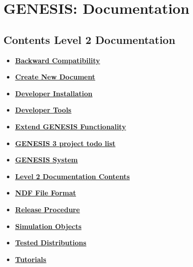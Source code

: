\documentclass[12pt]{article}
\begin{document}
\section*{GENESIS: Documentation}

\subsection*{Contents Level 2 Documentation}

\begin{itemize}

\item \href{../backward-compatibility/backward-compatibility.pdf}{\bf \underline{Backward Compatibility}}

\item \href{../create-document/create-document.pdf}{\bf \underline{Create New Document}}

\item \href{../developer-installation/developer-installation.pdf}{\bf \underline{Developer Installation}}

\item \href{../developer-tools/developer-tools.pdf}{\bf \underline{Developer Tools}}

\item \href{../genesis-extend-functionality/genesis-extend-functionality.pdf}{\bf \underline{Extend GENESIS Functionality}}

\item \href{../project-todo/project-todo.pdf}{\bf \underline{GENESIS 3 project todo list}}

\item \href{../genesis-system/genesis-system.pdf}{\bf \underline{GENESIS System}}

\item \href{../contents-level2/contents-level2.pdf}{\bf \underline{Level 2 Documentation Contents}}

\item \href{../ndf-file-format/ndf-file-format.pdf}{\bf \underline{NDF File Format}}

\item \href{../release-procedure/release-procedure.pdf}{\bf \underline{Release Procedure}}

\item \href{../simulation-objects/simulation-objects.pdf}{\bf \underline{Simulation Objects}}

\item \href{../tested-distributions/tested-distributions.pdf}{\bf \underline{Tested Distributions}}

\item \href{../tutorial-genesis/tutorial-genesis.pdf}{\bf \underline{Tutorials}}


\end{itemize}

\end{document}
